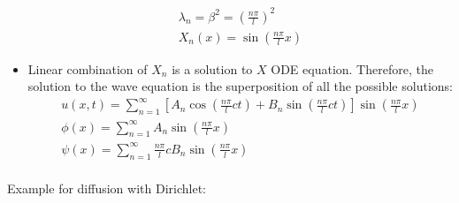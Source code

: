 \documentclass[12pt, a4paper]{article}
\begin{document}
\begin{itemize}
\begin{gather*}
        \lambda_n = \beta^2 = \left(\frac{n\pi}{l}\right)^2\\
        X_n(x) = \sin{\left(\frac{n\pi}{l}x\right)}
    \end{gather*}
    \item Linear combination of $X_n$ is a solution to $X$ ODE equation. Therefore, the solution to the wave equation is the superposition of all the possible solutions:
    \begin{gather*}
        u(x, t) = \sum_{n=1}^{\infty} \left[A_n\cos{\left(\frac{n\pi}{l}ct\right)} + B_n\sin{\left(\frac{n\pi}{l}ct\right)}\right]\sin{\left(\frac{n\pi}{l}x\right)}\\
        \phi(x) = \sum_{n=1}^{\infty} A_n\sin{\left(\frac{n\pi}{l}x\right)}\\
        \psi(x) = \sum_{n=1}^{\infty} \frac{n\pi}{l}c B_n\sin{\left(\frac{n\pi}{l}x\right)}\\
    \end{gather*}
\end{itemize}
Example for diffusion with Dirichlet:
\end{document}
